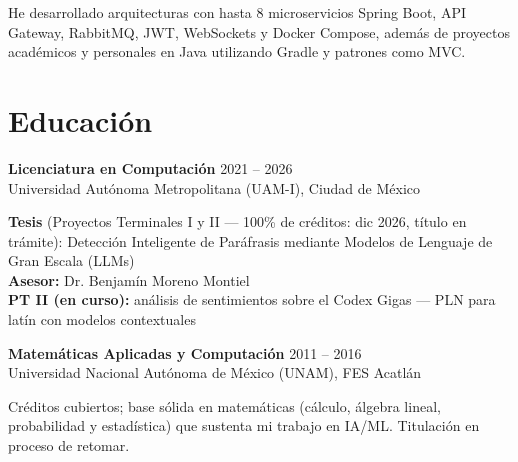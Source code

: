 \documentclass[10pt,letterpaper]{article}
\newcommand{\entry}[4]{%
  \noindent
  \textbf{#1} \hfill {\small\color{textsec}#2}\\
  {\small\color{accent}#3}
  \vspace{0.08cm}
  \par\noindent#4
  \par\vspace{0.16cm}
}
\newcommand{\decorule}{\vspace{0.1cm}{\color{accent}\rule{1.5cm}{2.5pt}}\vspace{0.2cm}}
\begin{document}
He desarrollado arquitecturas con hasta 8 microservicios Spring Boot, API Gateway, RabbitMQ, JWT, WebSockets y Docker Compose, adem\'{a}s de proyectos acad\'{e}micos y personales en Java utilizando Gradle y patrones como MVC.

\decorule

\vspace{0.5cm}

\section*{Educaci\'{o}n}
\entry{Licenciatura en Computaci\'{o}n}
       {2021 -- 2026}
       {Universidad Aut\'{o}noma Metropolitana (UAM-I), Ciudad de M\'{e}xico}
       {\textbf{Tesis} (Proyectos Terminales I y II — 100\% de cr\'{e}ditos: dic 2026, t\'{i}tulo en tr\'{a}mite): Detecci\'{o}n Inteligente de Par\'{a}frasis mediante Modelos de Lenguaje de Gran Escala (LLMs) \\
        \textbf{Asesor:} Dr. Benjam\'{i}n Moreno Montiel \\
        \textbf{PT II (en curso):} an\'{a}lisis de sentimientos sobre el Codex Gigas — PLN para lat\'{i}n con modelos contextuales}
\entry{Matem\'{a}ticas Aplicadas y Computaci\'{o}n}
       {2011 -- 2016}
       {Universidad Nacional Aut\'{o}noma de M\'{e}xico (UNAM), FES Acatl\'{a}n}
       {Cr\'{e}ditos cubiertos; base s\'{o}lida en matem\'{a}ticas (c\'{a}lculo, \'{a}lgebra lineal, probabilidad y estad\'{i}stica) que sustenta mi trabajo en IA/ML. Titulaci\'{o}n en proceso de retomar.}
       
       \newpage

\end{document}
